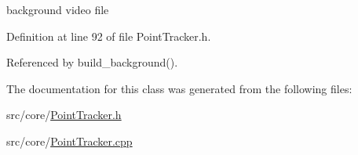 background video file 



\-Definition at line 92 of file \-Point\-Tracker.\-h.



\-Referenced by build\-\_\-background().



\-The documentation for this class was generated from the following files\-:\begin{DoxyCompactItemize}
\item 
src/core/\hyperlink{_point_tracker_8h}{\-Point\-Tracker.\-h}\item 
src/core/\hyperlink{_point_tracker_8cpp}{\-Point\-Tracker.\-cpp}\end{DoxyCompactItemize}
